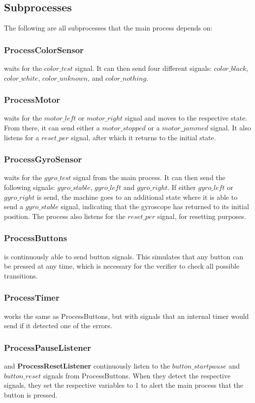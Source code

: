 \documentclass[a4paper,oneside,11pt]{article}
\begin{document}
\subsection{Subprocesses}
The following are all subprocesses that the main process depends on:

\subsubsection{ProcessColorSensor} waits for the $color\_test$ signal. It can then send four different signals: $color\_black$, $color\_white$, $color\_unknown$, and $color\_nothing$.

\subsubsection{ProcessMotor} waits for the $motor\_left$ or $motor\_right$ signal and moves to the respective state. From there, it can send either a $motor\_stopped$ or a $motor\_jammed$ signal. It also listens for a $reset\_per$ signal, after which it returns to the initial state.

\subsubsection{ProcessGyroSensor} waits for the $gyro\_test$ signal from the main process. It can then send the following signals: $gyro\_stable$, $gyro\_left$ and $gyro\_right$. If either $gyro\_left$ or $gyro\_right$ is send, the machine goes to an additional state where it is able to send a $gyro\_stable$ signal, indicating that the gyroscope has returned to its initial position. The process also listens for the $reset\_per$ signal, for resetting purposes.

\subsubsection{ProcessButtons} is continuously able to send button signals. This simulates that any button can be pressed at any time, which is necessary for the verifier to check all possible transitions. 

\subsubsection{ProcessTimer} works the same as ProcessButtons, but with signals that an internal timer would send if it detected one of the errors.

\subsubsection{ProcessPauseListener} and \textbf{ProcessResetListener} continuously listen to the $button\_startpause$ and $button\_reset$ signals from ProcessButtons. When they detect the respective signals, they set the respective variables to 1 to alert the main process that the button is pressed.
\end{document}
